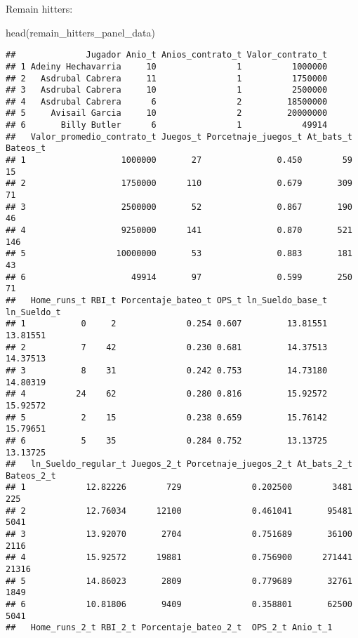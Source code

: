 \documentclass[
]{article}
\newenvironment{Shaded}{\begin{snugshade}}{\end{snugshade}}
\newcommand{\FunctionTok}[1]{\textcolor[rgb]{0.00,0.00,0.00}{#1}}
\newcommand{\NormalTok}[1]{#1}
\begin{document}
Remain hitters:

\begin{Shaded}
\begin{Highlighting}[]
\FunctionTok{head}\NormalTok{(remain\_hitters\_panel\_data)}
\end{Highlighting}
\end{Shaded}

\begin{verbatim}
##              Jugador Anio_t Anios_contrato_t Valor_contrato_t
## 1 Adeiny Hechavarria     10                1          1000000
## 2   Asdrubal Cabrera     11                1          1750000
## 3   Asdrubal Cabrera     10                1          2500000
## 4   Asdrubal Cabrera      6                2         18500000
## 5     Avisail Garcia     10                2         20000000
## 6       Billy Butler      6                1            49914
##   Valor_promedio_contrato_t Juegos_t Porcetnaje_juegos_t At_bats_t Bateos_t
## 1                   1000000       27               0.450        59       15
## 2                   1750000      110               0.679       309       71
## 3                   2500000       52               0.867       190       46
## 4                   9250000      141               0.870       521      146
## 5                  10000000       53               0.883       181       43
## 6                     49914       97               0.599       250       71
##   Home_runs_t RBI_t Porcentaje_bateo_t OPS_t ln_Sueldo_base_t ln_Sueldo_t
## 1           0     2              0.254 0.607         13.81551    13.81551
## 2           7    42              0.230 0.681         14.37513    14.37513
## 3           8    31              0.242 0.753         14.73180    14.80319
## 4          24    62              0.280 0.816         15.92572    15.92572
## 5           2    15              0.238 0.659         15.76142    15.79651
## 6           5    35              0.284 0.752         13.13725    13.13725
##   ln_Sueldo_regular_t Juegos_2_t Porcetnaje_juegos_2_t At_bats_2_t Bateos_2_t
## 1            12.82226        729              0.202500        3481        225
## 2            12.76034      12100              0.461041       95481       5041
## 3            13.92070       2704              0.751689       36100       2116
## 4            15.92572      19881              0.756900      271441      21316
## 5            14.86023       2809              0.779689       32761       1849
## 6            10.81806       9409              0.358801       62500       5041
##   Home_runs_2_t RBI_2_t Porcentaje_bateo_2_t  OPS_2_t Anio_t_1

\end{verbatim}
\end{document}
